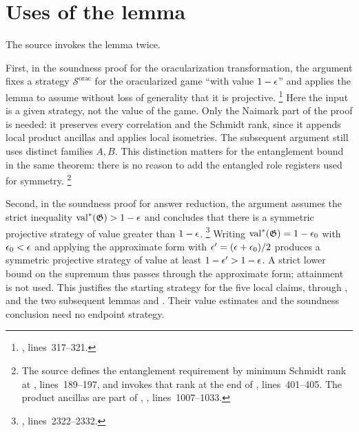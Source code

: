 \documentclass[11pt]{article}
\newcommand{\val}{\operatorname{val}}
\newcommand{\game}{\mathfrak{G}}
\newcommand{\strategy}{\mathcal{S}}
\begin{document}
\section{Uses of the lemma}

The source invokes the lemma twice.

First, in the soundness proof for the oracularization transformation, the
argument fixes a strategy $\strategy^{\mathrm{orac}}$ for the oracularized game
``with value $1-\epsilon$'' and applies the lemma to assume without loss of
generality that it is projective.%
\footnote{,
lines~317--321.}
Here the input is a given strategy, not the value of the game. Only the
Naimark part of the proof is needed: it preserves every correlation and the
Schmidt rank, since it appends local product ancillas and applies local
isometries. The subsequent argument still uses distinct families $A,B$.
This distinction matters for the entanglement bound in the same theorem:
there is no reason to add the entangled role registers used for symmetry.%
\footnote{The source defines the entanglement requirement by minimum Schmidt
rank at ,
lines~189--197, and invokes that rank at the end of
, lines~401--405.
The product ancillas are part of ,
, lines~1007--1033.}

Second, in the soundness proof for answer reduction, the argument assumes the
strict inequality $\val^*(\game) > 1-\eps$ and concludes that there is a
symmetric projective strategy of value greater than $1-\epsilon$.%
\footnote{,
lines~2322--2332.}
Writing $\val^*(\game) = 1-\eps_0$ with $\epsilon_0 < \epsilon$ and applying the
approximate form with $\epsilon' = (\epsilon+\epsilon_0)/2$ produces a symmetric
projective strategy of value at least $1-\epsilon' > 1-\epsilon$.  A strict lower
bound on the supremum thus passes through the approximate form; attainment is
not used. This justifies the starting strategy for the five local claims,
 through , and the two subsequent lemmas
 and . Their value estimates and the
soundness conclusion need no endpoint strategy.
\end{document}
